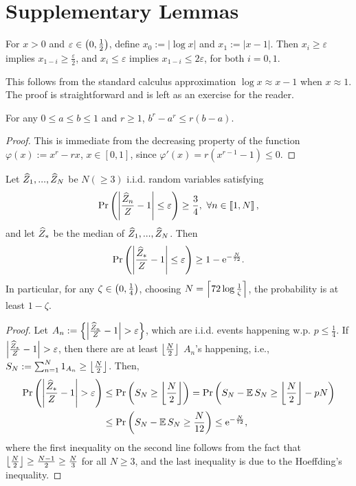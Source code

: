 \section{Supplementary Lemmas}
\label{app:supp}
\begin{lemma}
    For $x>0$ and $\varepsilon\in\left(0,\frac{1}{2}\right)$, define $x_0:=|\log x|$ and $x_1:=|x-1|$. Then $x_i\ge\varepsilon$ implies $x_{1-i}\ge\frac{\varepsilon}{2}$, and $x_i\le\varepsilon$ implies $x_{1-i}\le2\varepsilon$, for both $i=0,1$.
    \label{lem:logat1}
\end{lemma}
This follows from the standard calculus approximation $\log x\approx x-1$ when $x\approx1$. The proof is straightforward and is left as an exercise for the reader.

\begin{lemma}
    For any $0\le a\le b\le1$ and $r\ge1$, $b^r-a^r\le r(b-a)$.
    \label{lem:power_r_diff}
\end{lemma}
\begin{proof}
    This is immediate from the decreasing property of the function $\varphi(x):=x^r-rx$, $x\in[0,1]$, since $\varphi'(x)=r(x^{r-1}-1)\le0$.
\end{proof}

\begin{lemma}
    Let $\widehat{Z}_1,...,\widehat{Z}_N$ be $N(\ge3)$ i.i.d. random variables satisfying 
    $$\operatorname{Pr}\left(\left|\frac{\widehat{Z}_n}{Z}-1\right|\le\varepsilon\right)\ge\frac{3}{4},~\forall n\in\left[\!\left[1,N\right]\!\right],$$
    and let $\widehat{Z}_*$ be the median of $\widehat{Z}_1,...,\widehat{Z}_N$. Then
    $$\operatorname{Pr}\left(\left|\frac{\widehat{Z}_*}{Z}-1\right|\le\varepsilon\right)\ge1-\mathrm{e}^{-\frac{N}{72}}.$$
    In particular, for any $\zeta\in\left(0,\frac14\right)$, choosing $N=\left\lceil72\log\frac{1}{\zeta}\right\rceil$, the probability is at least $1-\zeta$.
    \label{lem:med_trick}
\end{lemma}
\begin{proof}
    Let $A_n:=\cu{\abs{\frac{\Zh_n}{Z}-1}>\varepsilon}$, which are i.i.d. events happening w.p. $p\le\frac{1}{4}$. If $\abs{\frac{\Zh_*}{Z}-1}>\varepsilon$, then there are at least $\left\lfloor\frac{N}{2}\right\rfloor$ $A_n$'s happening, i.e., $S_N:=\sum_{n=1}^N1_{A_n}\ge\left\lfloor\frac{N}{2}\right\rfloor$. Then,
    \begin{align*}
    \prob\ro{\abs{\frac{\Zh_*}{Z}-1}>\varepsilon}&\le\prob\ro{S_N\ge\floor{\frac{N}{2}}}=\prob\ro{S_N-\E S_N\ge\floor{\frac{N}{2}}-pN}\\ 
    &\le\prob\ro{S_N-\E S_N\ge\frac{N}{12}}\le\e^{-\frac{N}{72}},
    \end{align*}
    where the first inequality on the second line follows from the fact that $\left\lfloor\frac{N}{2}\right\rfloor\ge\frac{N-1}{2}\ge\frac{N}{3}$ for all $N\ge3$, and the last inequality is due to the Hoeffding's inequality.
\end{proof}

